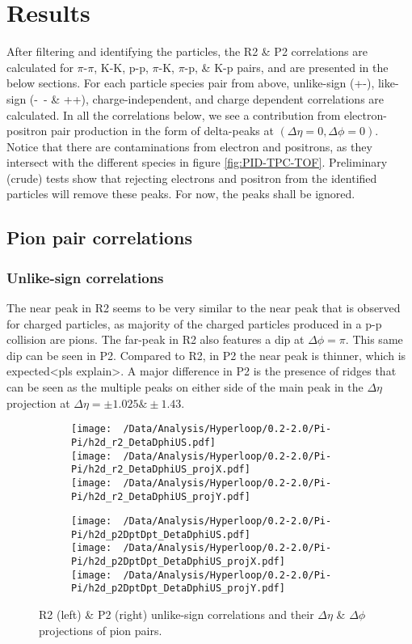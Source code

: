 \documentclass[12pt,a4paper,twoside]{report}
\begin{document}
\chapter{Results}\label{Ch:Results}
After filtering and identifying the particles, the R2 \& P2 correlations are calculated for $\pi$-$\pi$, K-K, p-p, $\pi$-K, $\pi$-p, \& K-p pairs, and are presented in the below sections. For each particle species pair from above, unlike-sign (+-), like-sign (-\ - \& ++), charge-independent, and charge dependent correlations are calculated. In all the correlations below, we see a contribution from electron-positron pair production in the form of delta-peaks at $(\Delta\eta=0,\Delta\phi=0)$. Notice that there are contaminations from electron and positrons, as they intersect with the different species in figure \ref{fig:PID-TPC-TOF}. Preliminary (crude) tests show that rejecting electrons and positron from the identified particles will remove these peaks. For now, the peaks shall be ignored.
\section{Pion pair correlations}
\subsection{Unlike-sign correlations}
The near peak in R2 seems to be very similar to the near peak that is observed for charged particles, as majority of the charged particles produced in a p-p collision are pions. The far-peak in R2 also features a dip at $\Delta\phi=\pi$.
This same dip can be seen in P2. Compared to R2, in P2 the near peak is thinner, which is expected<pls explain>. A major difference in P2 is the presence of ridges that can be seen as the multiple peaks on either side of the main peak in the $\Delta\eta$ projection at $\Delta\eta=\pm1.025\&\pm1.43$.
\begin{figure}[H]
	\begin{subfigure}{0.49\linewidth}
		\texttt{[image: ~/Data/Analysis/Hyperloop/0.2-2.0/Pi-Pi/h2d\_r2\_DetaDphiUS.pdf]}\\
		\texttt{[image: ~/Data/Analysis/Hyperloop/0.2-2.0/Pi-Pi/h2d\_r2\_DetaDphiUS\_projX.pdf]}\\
		\texttt{[image: ~/Data/Analysis/Hyperloop/0.2-2.0/Pi-Pi/h2d\_r2\_DetaDphiUS\_projY.pdf]}\\
	\end{subfigure}
	\begin{subfigure}{0.49\linewidth}
		\texttt{[image: ~/Data/Analysis/Hyperloop/0.2-2.0/Pi-Pi/h2d\_p2DptDpt\_DetaDphiUS.pdf]}\\
		\texttt{[image: ~/Data/Analysis/Hyperloop/0.2-2.0/Pi-Pi/h2d\_p2DptDpt\_DetaDphiUS\_projX.pdf]}\\
		\texttt{[image: ~/Data/Analysis/Hyperloop/0.2-2.0/Pi-Pi/h2d\_p2DptDpt\_DetaDphiUS\_projY.pdf]}\\
	\end{subfigure}
	\caption{R2 (left) \& P2 (right) unlike-sign correlations and their $\Delta\eta$ \& $\Delta\phi$ projections of pion pairs.}
\end{figure}
\end{document}

